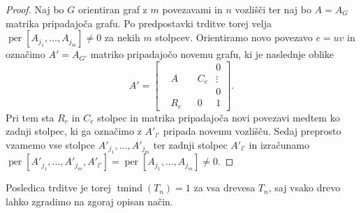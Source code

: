 \documentclass[12pt,a4paper,twoside]{article}
\theoremstyle{definition} %
\theoremstyle{plain} %
\numberwithin{equation}{section}  %
\DeclareMathOperator{\per}{per}
\DeclareMathOperator{\tmind}{tmind}
\begin{document}
 \begin{proof}
Naj bo $G$ orientiran graf z $m$ povezavami in $n$ vozlišči ter naj bo $A = A_G$ matrika pripadajoča grafu. Po predpostavki trditve torej velja $\per[A_{j_1}, \ldots, A_{j_m}]  \neq 0$ za nekih $m$ stolpcev. Orientiramo novo povezavo $e = uv$ in označimo $A' = A_{G'}$ matriko pripadajočo novemu grafu, ki je naslednje oblike
$$
A' = \left[ \begin{matrix}
  &  &  &  & 0 \\
  & A &  & C_e & \vdots \\
  &  &  &  & 0 \\ 
 & R_e &  & 0 & 1 
\end{matrix} \right].
$$
Pri tem sta $R_e$ in $C_e$ stolpec in matrika pripadajoča novi povezavi medtem ko zadnji stolpec, ki ga označimo z $A'_{l'}$ pripada novemu vozlišču. Sedaj preprosto vzamemo vse stolpce $A'_{j_1}, \ldots, A'_{j_m}$ ter zadnji stolpec $A'_{l'}$ in izračunamo 
$\per[A'_{j_1}, \ldots, A'_{j_m}, A'_{l'} ] = \per[A_{j_1}, \ldots, A_{j_m}]  \neq 0$.
\end{proof}
Posledica trditve je torej $\tmind(T_n) = 1$ za vsa drevesa $T_n$, saj vsako drevo lahko zgradimo na zgoraj opisan način.
\end{document}
